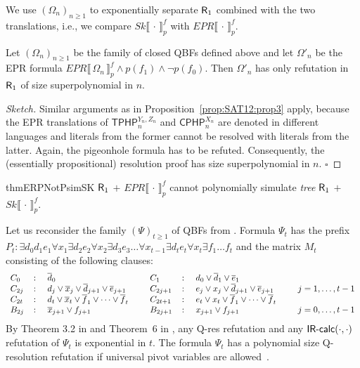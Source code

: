 \documentclass{llncs}
\newcommand{\qres}{\mbox{\sf Q-res}}
\newcommand{\Rfo}{$\mbox{\sf R}_1$}
\newcommand{\IRcalcPM}[2]{$\mbox{\sf IR-calc}(#1,#2)$}
\newcommand{\hkb}{\ensuremath{\Psi}}
\newcommand{\hkbt}[1]{\ensuremath{\hkb_{#1}}}
\newcommand{\SkQBFtoPL}[3]{\mathit{Sk}\llbracket\,#1\,\rrbracket_{#2}^{#3}}
\newcommand{\EPRQBFtoPL}[3]{\mathit{EPR}\llbracket\,#1\,\rrbracket_{#2}^{#3}}
\newcommand{\PHPText}{CPHP}
\newcommand{\TPHPTextp}{TPHP}
\newcommand{\PHPVar}[2]{\mbox{$\mathsf{\PHPText}_{#1}^{#2}$}}
\newcommand{\TPHPpVar}[2]{\mbox{$\mathsf{\TPHPTextp}_{#1}^{#2}$}}
\renewcommand{\qed}{\hfill\ensuremath{\square}}
\begin{document}
We use $(\Omega_n)_{n\geq 1}$ to exponentially separate \Rfo{}
combined with the two translations, i.e., we compare
$\SkQBFtoPL{\cdot}{p}{f}$ with $\EPRQBFtoPL{\cdot}{p}{f}$.


\begin{proposition}
Let $(\Omega_n)_{n\geq 1}$ be the family of closed QBFs defined above
and let $\Omega'_n$ be the EPR formula
$\EPRQBFtoPL{\Omega_n}{p}{f}\land p(f_{1}) \land \neg p(f_{0})$.  Then
$\Omega'_n$ has only refutation in \Rfo{} of size superpolynomial in
$n$.
\end{proposition}
\begin{proof}[Sketch]
Similar arguments as in Proposition~\ref{prop:SAT12:prop3} apply,
because the EPR translations of $\TPHPpVar{n}{Y_n,Z_n}$ and
$\PHPVar{n}{X_n}$ are denoted in different languages and literals from
the former cannot be resolved with literals from the latter. Again,
the pigeonhole formula has to be refuted. Consequently, the
(essentially propositional) resolution proof has size superpolynomial
in $n$.  \qed
\end{proof}

\begin{restatable}{thm}{ERPNotPsimSK}
\label{thm:EPR-notpsim-SK}
\Rfo{} $+$ $\EPRQBFtoPL{\cdot}{p}{f}$ cannot polynomially
simulate \emph{tree} \Rfo{} $+$ $\SkQBFtoPL{\cdot}{p}{f}$.
\end{restatable}

Let us reconsider the family $(\hkb)_{t \geq 1}$ of QBFs from
\cite{DBLP:journals/iandc/BuningKF95}.  Formula $\hkbt{t}$ 
has the prefix $P_t\colon
\exists d_0 d_1 e_1 \forall x_1 \exists d_2 e_2 \forall x_2 \exists
d_3 e_3\ldots \forall x_{t-1} \exists d_t e_t \forall x_t \exists
f_{1}\ldots f_{t}
$
and the matrix $M_t$ consisting of the following clauses:
\begin{displaymath}
\begin{array}{lclclclcl}
C_0     & \colon & \overline{d}_0 & \hspace{0.5em} & 
C_1     & \colon & d_0 \lor \overline{d}_1 \lor \overline{e}_1 \\
C_{2j}   & \colon & d_j \lor \overline{x}_j \lor \overline{d}_{j+1} 
\lor \overline{e}_{j+1} & & 
C_{2j+1} & \colon & e_j \lor x_j \lor \overline{d}_{j+1} 
\lor \overline{e}_{j+1}
& \hspace{0.5em} & j=1,\ldots , t-1\\
C_{2t}   & \colon & d_t \lor \overline{x}_{t} \lor 
\overline{f}_{1}\lor \cdots  \lor \overline{f}_{t}
& &  
C_{2t+1} & \colon & e_t \lor x_{t} \lor \overline{f}_{1}\lor 
\cdots  \lor \overline{f}_{t}\\
B_{2j}  & \colon & \overline{x}_{j+1} \lor f_{j+1} & & 
B_{2j+1} & \colon & x_{j+1} \lor f_{j+1} & & j=0, \ldots , t-1
\end{array}
\end{displaymath}
By Theorem 3.2 in \cite{DBLP:journals/iandc/BuningKF95} and Theorem~6
in \cite{DBLP:conf/stacs/BeyersdorffCJ15}, any \qres{} refutation and
any \IRcalcPM{\cdot}{\cdot} refutation of \hkbt{t} is exponential
in $t$.  The formula $\hkbt{t}$ has a polynomial size Q-resolution
refutation if universal pivot variables are
allowed~\cite{DBLP:conf/cp/Gelder12}.
\end{document}

